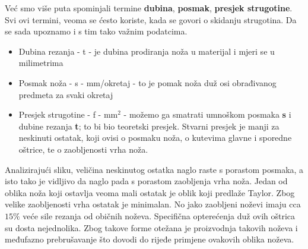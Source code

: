 \documentclass[a4paper,12pt]{article}
\numberwithin{figure}{section}
\begin{document}
Već smo više puta spominjali termine \textbf{dubina}, \textbf{posmak}, \textbf{presjek strugotine}. Svi ovi termini, veoma se ćesto koriste, kada se govori o skidanju strugotina. Da se sada upoznamo i s tim tako važnim podatcima.
\begin{itemize}
\item Dubina rezanja - t - je dubina prodiranja noža u materijal i mjeri se u milimetrima
\item Posmak noža - s - mm/okretaj - to je pomak noža duž osi obrađivanog predmeta za svaki okretaj
\item Presjek strugotine - f - mm$^2$ - možemo ga smatrati umnoškom posmaka \textbf{s} i dubine rezanja \textbf{t}; to bi bio teoretski presjek. Stvarni presjek je manji za neskinuti ostatak, koji ovisi o posmaku noža, o kutevima glavne i sporedne oštrice, te o zaobljenosti vrha noža.
\end{itemize}
Analizirajući sliku, veličina neskinutog ostatka naglo raste s porastom posmaka, a isto tako je vidljivo da naglo pada s porastom zaobljenja vrha noža. Jedan od oblika noža koji ostavlja veoma mali ostatak je oblik koji predlaže Taylor. Zbog velike zaobljenosti vrha ostatak je minimalan. No jako zaobljeni noževi imaju cca $15\%$ veće sile rezanja od običnih noževa.
Specifična opterećenja duž ovih oštrica su dosta nejednolika. Zbog takove forme otežana je proizvodnja takovih noževa i međufazno prebrušavanje što dovodi do rijeđe primjene ovakovih oblika noževa. 
\end{document}
